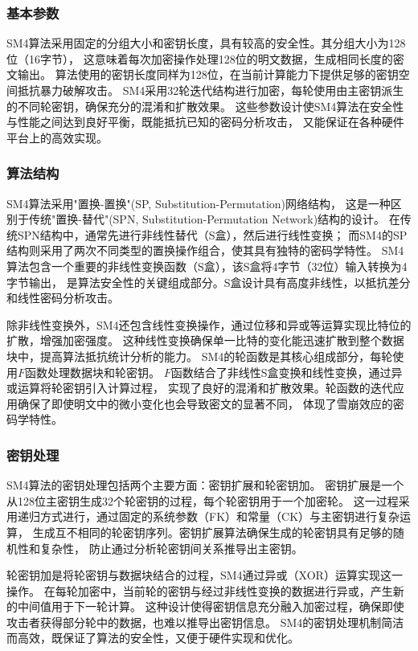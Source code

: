 \subsubsection{基本参数}

SM4算法采用固定的分组大小和密钥长度，具有较高的安全性。其分组大小为128位（16字节），
这意味着每次加密操作处理128位的明文数据，生成相同长度的密文输出。
算法使用的密钥长度同样为128位，在当前计算能力下提供足够的密钥空间抵抗暴力破解攻击。
SM4采用32轮迭代结构进行加密，每轮使用由主密钥派生的不同轮密钥，确保充分的混淆和扩散效果。
这些参数设计使SM4算法在安全性与性能之间达到良好平衡，既能抵抗已知的密码分析攻击，
又能保证在各种硬件平台上的高效实现。

\subsubsection{算法结构}

SM4算法采用"置换-置换"(SP, Substitution-Permutation)网络结构，
这是一种区别于传统"置换-替代"(SPN, Substitution-Permutation Network)结构的设计。
在传统SPN结构中，通常先进行非线性替代（S盒），然后进行线性变换；
而SM4的SP结构则采用了两次不同类型的置换操作组合，使其具有独特的密码学特性。
SM4算法包含一个重要的非线性变换函数（S盒），该S盒将4字节（32位）输入转换为4字节输出，
是算法安全性的关键组成部分。S盒设计具有高度非线性，以抵抗差分和线性密码分析攻击。

除非线性变换外，SM4还包含线性变换操作，通过位移和异或等运算实现比特位的扩散，增强加密强度。
这种线性变换确保单一比特的变化能迅速扩散到整个数据块中，提高算法抵抗统计分析的能力。
SM4的轮函数是其核心组成部分，每轮使用$F$函数处理数据块和轮密钥。
$F$函数结合了非线性S盒变换和线性变换，通过异或运算将轮密钥引入计算过程，
实现了良好的混淆和扩散效果。轮函数的迭代应用确保了即使明文中的微小变化也会导致密文的显著不同，
体现了雪崩效应的密码学特性。

\subsubsection{密钥处理}

SM4算法的密钥处理包括两个主要方面：密钥扩展和轮密钥加。
密钥扩展是一个从128位主密钥生成32个轮密钥的过程，每个轮密钥用于一个加密轮。
这一过程采用递归方式进行，通过固定的系统参数（FK）和常量（CK）与主密钥进行复杂运算，
生成互不相同的轮密钥序列。密钥扩展算法确保生成的轮密钥具有足够的随机性和复杂性，
防止通过分析轮密钥间关系推导出主密钥。

轮密钥加是将轮密钥与数据块结合的过程，SM4通过异或（XOR）运算实现这一操作。
在每轮加密中，当前轮的密钥与经过非线性变换的数据进行异或，产生新的中间值用于下一轮计算。
这种设计使得密钥信息充分融入加密过程，确保即使攻击者获得部分轮中的数据，也难以推导出密钥信息。
SM4的密钥处理机制简洁而高效，既保证了算法的安全性，又便于硬件实现和优化。

